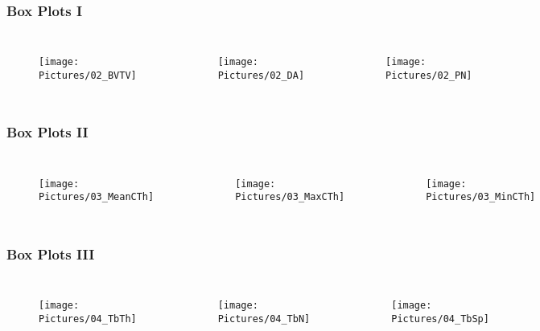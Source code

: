 \documentclass[xcolor=table]{beamer}
\begin{document}

\begin{frame}
	\frametitle{Box Plots I}
	\begin{columns}
		\centering
		\begin{figure}
			\texttt{[image: Pictures/02\_BVTV]}
		\end{figure}
		\centering
		\begin{figure}
			\texttt{[image: Pictures/02\_DA]}
		\end{figure}
		\centering
		\begin{figure}
			\texttt{[image: Pictures/02\_PN]}
		\end{figure}
	\end{columns}
\end{frame}

\begin{frame}
	\frametitle{Box Plots II}
	\begin{columns}
		\column[c]{0.3\linewidth}
		\centering
		\begin{figure}
			\texttt{[image: Pictures/03\_MeanCTh]}
		\end{figure}
		\column[c]{0.3\linewidth}
		\centering
		\begin{figure}
			\texttt{[image: Pictures/03\_MaxCTh]}
		\end{figure}
		\column[c]{0.3\linewidth}
		\centering
		\begin{figure}
			\texttt{[image: Pictures/03\_MinCTh]}
		\end{figure}
	\end{columns}
\end{frame}

\begin{frame}
	\frametitle{Box Plots III}
	\begin{columns}
		\centering
		\begin{figure}
			\texttt{[image: Pictures/04\_TbTh]}
		\end{figure}
		\centering
		\begin{figure}
			\texttt{[image: Pictures/04\_TbN]}
		\end{figure}
		\centering
		\begin{figure}
			\texttt{[image: Pictures/04\_TbSp]}
		\end{figure}
	\end{columns}
\end{frame}
\end{document}
